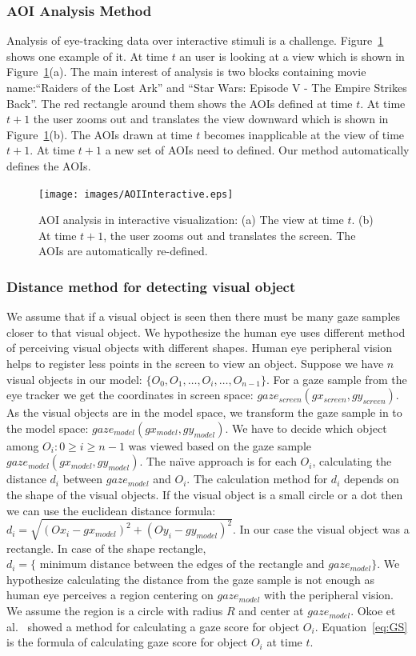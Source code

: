 \subsubsection{AOI Analysis Method}
Analysis of eye-tracking data over interactive stimuli is a challenge. Figure~\ref{fig:AOIInteractive} shows one example of it. At time $t$ an user is looking at a view which is shown in Figure~\ref{fig:AOIInteractive}(a). The main interest of analysis is two blocks containing movie name:``Raiders of the Lost Ark'' and ``Star Wars: Episode V - The Empire Strikes Back''. The red rectangle around them shows the AOIs defined at time $t$. At time $t+1$ the user zooms out and translates the view downward which is shown in Figure~\ref{fig:AOIInteractive}(b). The AOIs drawn at time $t$ becomes inapplicable at the view of time $t+1$. At time $t+1$ a new set of AOIs need to defined. Our method automatically defines the AOIs.

\begin{figure}[htb]
  \centering
  \texttt{[image: images/AOIInteractive.eps]}
  \caption{AOI analysis in interactive visualization: (a) The view at time $t$. (b) At time $t+1$, the user zooms out and translates the screen. The AOIs are automatically re-defined.}
	\label{fig:AOIInteractive}
\end{figure}

\subsubsection{Distance method for detecting visual object}
We assume that if a visual object is seen then there must be many gaze samples closer to that visual object. We hypothesize the human eye uses different method of perceiving visual objects with different shapes. Human eye peripheral vision helps to register less points in the screen to view an object. Suppose we have $n$ visual objects in our model: $\{O_0, O_1, \ldots, O_i, \ldots, O_{n-1} \}$. For a gaze sample from the eye tracker we get the coordinates in screen space: $gaze_{screen}(gx_{screen}, gy_{screen})$. As the visual objects are in the model space, we transform the gaze sample in to the model space: $gaze_{model}(gx_{model}, gy_{model})$. We have to decide which object among ${O_i: 0 \geq i \geq n-1}$ was viewed based on the gaze sample $gaze_{model}(gx_{model}, gy_{model})$. The na\"{\i}ve approach is for each $O_i$, calculating the distance $d_i$ between $gaze_{model}$ and $O_i$. The calculation method for $d_i$ depends on the shape of the visual objects. If the visual object is a small circle or a dot then we can use the euclidean distance formula: $d_i =\sqrt{{(Ox_i-gx_{model})}^2+{(Oy_i-gy_{model})}^2}$. In our case the visual object was a rectangle. In case of the shape rectangle, $d_i =\{ \text{ minimum distance between the edges of the rectangle and } gaze_{model}\}$. We hypothesize calculating the distance from the gaze sample is not enough as human eye perceives a region centering on $gaze_{model}$ with the peripheral vision. We assume the region is a circle with radius $R$ and center at $gaze_{model}$.  Okoe et al.~\cite{okoe2014gaze} showed a method for calculating a gaze score for object $O_i$. Equation~\ref{eq:GS} is the formula of calculating gaze score for object $O_i$ at time $t$. 


